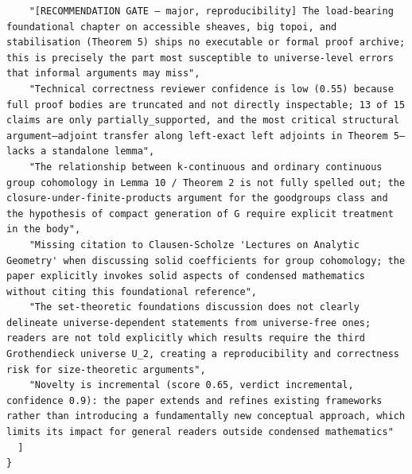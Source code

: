 \documentclass[11pt]{article}
\begin{document}
\begin{verbatim}
    "[RECOMMENDATION GATE — major, reproducibility] The load-bearing foundational chapter on accessible sheaves, big topoi, and stabilisation (Theorem 5) ships no executable or formal proof archive; this is precisely the part most susceptible to universe-level errors that informal arguments may miss",
    "Technical correctness reviewer confidence is low (0.55) because full proof bodies are truncated and not directly inspectable; 13 of 15 claims are only partially_supported, and the most critical structural argument—adjoint transfer along left-exact left adjoints in Theorem 5—lacks a standalone lemma",
    "The relationship between k-continuous and ordinary continuous group cohomology in Lemma 10 / Theorem 2 is not fully spelled out; the closure-under-finite-products argument for the goodgroups class and the hypothesis of compact generation of G require explicit treatment in the body",
    "Missing citation to Clausen-Scholze 'Lectures on Analytic Geometry' when discussing solid coefficients for group cohomology; the paper explicitly invokes solid aspects of condensed mathematics without citing this foundational reference",
    "The set-theoretic foundations discussion does not clearly delineate universe-dependent statements from universe-free ones; readers are not told explicitly which results require the third Grothendieck universe U_2, creating a reproducibility and correctness risk for size-theoretic arguments",
    "Novelty is incremental (score 0.65, verdict incremental, confidence 0.9): the paper extends and refines existing frameworks rather than introducing a fundamentally new conceptual approach, which limits its impact for general readers outside condensed mathematics"
  ]
}
\end{verbatim}
\end{document}
